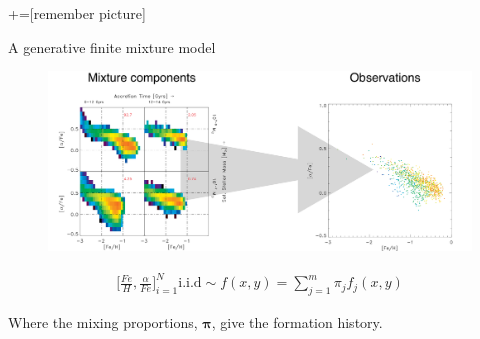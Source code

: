 \documentclass{beamer}
\newcommand{\eqn}[1]{\begin{align*}
#1
\end{align*}}
\newcommand{\vect}[1]{\boldsymbol{\mathbf{#1}}}
\newcommand{\afe}{\frac{\alpha}{Fe}}
\newcommand{\feh}{\frac{Fe}{H}}
\newcommand{\vp}{\vect{\pi}}
\begin{document}
+=[remember picture]

\everymath{\displaystyle}











\begin{frame}{A generative finite mixture model}
	
	
		
	\begin{figure}
			\begin{center}
				\includegraphics[scale=0.31]{denstoobs.pdf}
			\end{center}
	\end{figure}
	
	\vspace{-8mm}
	
	\eqn{
		\Bigg[\feh,\afe\Bigg]_{i=1}^{N} \text{i.i.d} \sim f(x,y) = \sum^m_{j=1} \pi_j f_j(x,y)
	}
	
	\begin{center}
		Where the mixing proportions, $\vp$, give the formation history.
	\end{center}
	
\end{frame}
\end{document}
